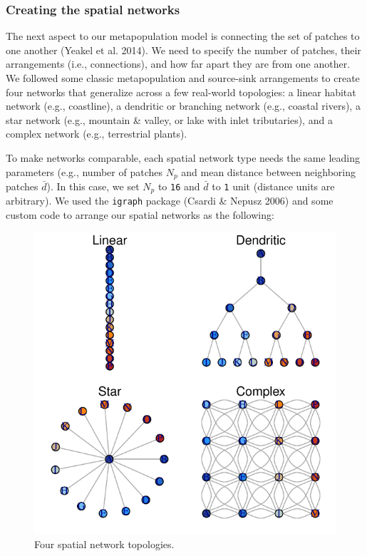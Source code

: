 \documentclass[]{article}
\begin{document}
\hypertarget{creating-the-spatial-networks}{%
\subsubsection{Creating the spatial
networks}\label{creating-the-spatial-networks}}

The next aspect to our metapopulation model is connecting the set of
patches to one another (Yeakel et al. 2014). We need to specify the
number of patches, their arrangements (i.e., connections), and how far
apart they are from one another. We followed some classic metapopulation
and source-sink arrangements to create four networks that generalize
across a few real-world topologies: a linear habitat network (e.g.,
coastline), a dendritic or branching network (e.g., coastal rivers), a
star network (e.g., mountain \& valley, or lake with inlet tributaries),
and a complex network (e.g., terrestrial plants).

To make networks comparable, each spatial network type needs the same
leading parameters (e.g., number of patches \(N_p\) and mean distance
between neighboring patches \(\bar{d}\)). In this case, we set \(N_p\)
to \texttt{16} and \(\bar{d}\) to \texttt{1} unit (distance units are
arbitrary). We used the \texttt{igraph} package (Csardi \& Nepusz 2006)
and some custom code to arrange our spatial networks as the following:

\begin{figure}[H]

{\centering \includegraphics{Managing_for_ecological_surprises_in_metapopulations_files/figure-latex/networks-1} 

}

\caption{Four spatial network topologies.}\label{fig:networks}
\end{figure}
\end{document}

